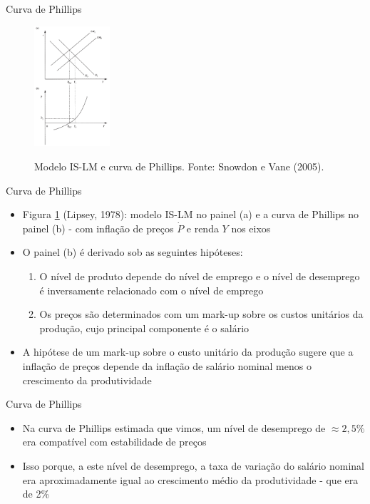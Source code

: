 \documentclass[10pt]{beamer}
\begin{document}
\begin{frame}{Curva de Phillips}
    \begin{figure}
        \centering
        \href{https://raw.githubusercontent.com/pvfonseca/pec/main/notas/figures/aula8_fig10.PNG}{\includegraphics[width=0.25\textwidth]{./figures/aula8_fig10.PNG}}
        \caption{Modelo IS-LM e curva de Phillips. Fonte: Snowdon e Vane (2005).}
        \label{fig15}
    \end{figure}
\end{frame}

\begin{frame}{Curva de Phillips}
    \begin{itemize}
        \item Figura \ref{fig15} (Lipsey, 1978): modelo IS-LM no painel (a) e a curva de Phillips no painel (b) - com inflação de preços $\dot{P}$ e renda $Y$ nos eixos
        \bigskip
        \item O painel (b) é derivado sob as seguintes hipóteses:
        \bigskip
        \begin{enumerate}
            \item O nível de produto depende do nível de emprego e o nível de desemprego é inversamente relacionado com o nível de emprego
            \bigskip
            \item Os preços são determinados com um mark-up sobre os custos unitários da produção, cujo principal componente é o salário
        \end{enumerate}
        \bigskip
        \item A hipótese de um mark-up sobre o custo unitário da produção sugere que a inflação de preços depende da inflação de salário nominal menos o crescimento da produtividade
    \end{itemize}
\end{frame}

\begin{frame}{Curva de Phillips}
    \begin{itemize}
        \item Na curva de Phillips estimada que vimos, um nível de desemprego de $\approx 2,5\%$ era compatível com estabilidade de preços
        \bigskip
        \item Isso porque, a este nível de desemprego, a taxa de variação do salário nominal era aproximadamente igual ao crescimento médio da produtividade - que era de 2\%
    \end{itemize}
\end{frame}
\end{document}
